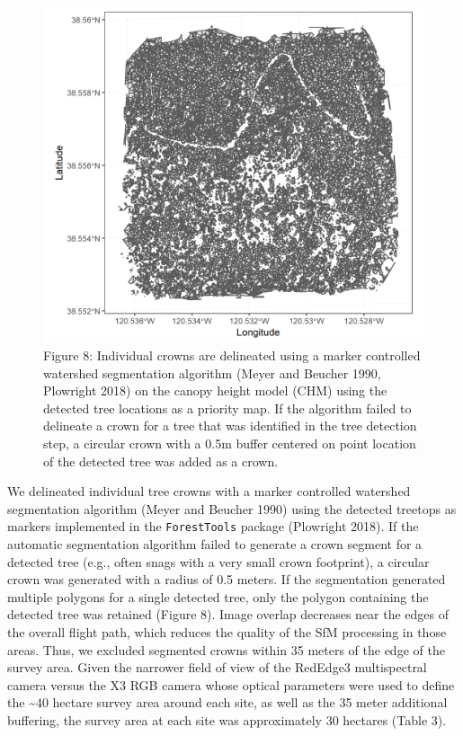 \documentclass[]{article}
\begin{document}
\begin{figure}
\centering
\includegraphics{../../figures/eldo_3k_3_crowns.png}
\caption{Figure 8: Individual crowns are delineated using a marker
controlled watershed segmentation algorithm (Meyer and Beucher 1990,
Plowright 2018) on the canopy height model (CHM) using the detected tree
locations as a priority map. If the algorithm failed to delineate a
crown for a tree that was identified in the tree detection step, a
circular crown with a 0.5m buffer centered on point location of the
detected tree was added as a crown.}
\end{figure}

We delineated individual tree crowns with a marker controlled watershed
segmentation algorithm (Meyer and Beucher 1990) using the detected
treetops as markers implemented in the \texttt{ForestTools} package
(Plowright 2018). If the automatic segmentation algorithm failed to
generate a crown segment for a detected tree (e.g., often snags with a
very small crown footprint), a circular crown was generated with a
radius of 0.5 meters. If the segmentation generated multiple polygons
for a single detected tree, only the polygon containing the detected
tree was retained (Figure 8). Image overlap decreases near the edges of
the overall flight path, which reduces the quality of the SfM processing
in those areas. Thus, we excluded segmented crowns within 35 meters of
the edge of the survey area. Given the narrower field of view of the
RedEdge3 multispectral camera versus the X3 RGB camera whose optical
parameters were used to define the \textasciitilde{}40 hectare survey
area around each site, as well as the 35 meter additional buffering, the
survey area at each site was approximately 30 hectares (Table 3).
\end{document}
